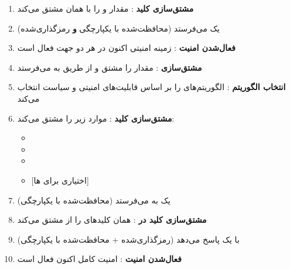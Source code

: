 \begin{enumerate}
  \begin{itemize}
  \tightlist
  \item
    قابلیت‌های امنیتی  بازپخش‌شده با آنچه فرستاده شده مطابقت دارند (ضد-)
  \item
    محافظت یکپارچگی پیام با استفاده از  مشتق‌شده
  \end{itemize}
\item
  \textbf{مشتق‌سازی کلید }:  مقدار  و  را با همان  مشتق می‌کند
\item
   یک  می‌فرستد (محافظت‌شده با یکپارچگی \textbf{و} رمزگذاری‌شده)
\item
  \textbf{فعال‌شدن امنیت }: زمینه امنیتی  اکنون در هر دو جهت فعال است
\item
  \textbf{مشتق‌سازی }:  مقدار  را مشتق و از طریق  به  می‌فرستد
\item
  \textbf{انتخاب الگوریتم }:  الگوریتم‌های  را بر اساس قابلیت‌های امنیتی  و سیاست  انتخاب می‌کند
\item
  \textbf{مشتق‌سازی کلید }:  موارد زیر را مشتق می‌کند:

  \begin{itemize}
  \tightlist
  \item
  \item
  \item
  \item
     [اختیاری برای ها]
  \end{itemize}
\item
   یک  به  می‌فرستد (محافظت‌شده با یکپارچگی)
\item
  \textbf{مشتق‌سازی کلید  در }:  همان کلیدهای  را از  مشتق می‌کند
\item
   با یک  پاسخ می‌دهد (رمزگذاری‌شده + محافظت‌شده با یکپارچگی)
\item
  \textbf{فعال‌شدن امنیت }: امنیت کامل  اکنون فعال است
\end{enumerate}

